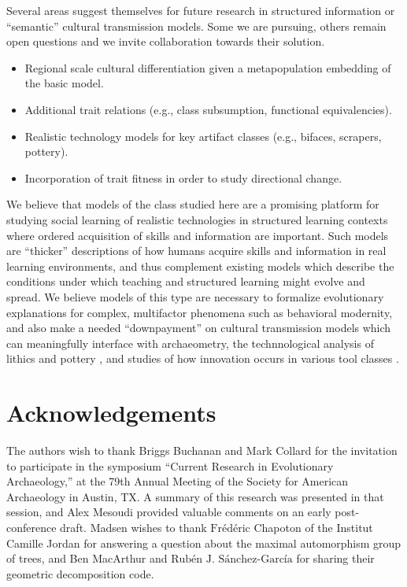 \documentclass[graybox,natbib]{svmult}
\begin{document}
Several areas suggest themselves for future research in structured
information or ``semantic'' cultural transmission models. Some we are
pursuing, others remain open questions and we invite collaboration
towards their solution.

\begin{itemize}
\itemsep1pt\parskip0pt
\item
  Regional scale cultural differentiation given a metapopulation
  embedding of the basic model.
\item
  Additional trait relations (e.g., class subsumption, functional
  equivalencies).
\item
  Realistic technology models for key artifact classes (e.g., bifaces,
  scrapers, pottery).
\item
  Incorporation of trait fitness in order to study directional change.
\end{itemize}

We believe that models of the class studied here are a promising
platform for studying social learning of realistic technologies in
structured learning contexts where ordered acquisition of skills and
information are important. Such models are ``thicker'' descriptions of
how humans acquire skills and information in real learning environments,
and thus complement existing models which describe the conditions under
which teaching and structured learning might evolve and spread. We
believe models of this type are necessary to formalize evolutionary
explanations for complex, multifactor phenomena such as behavioral
modernity, and also make a needed ``downpayment'' on cultural
transmission models which can meaningfully interface with archaeometry,
the technnological analysis of lithics and pottery
\citep{tostevin2012seeing}, and studies of how innovation occurs in
various tool classes \citep[e.g.,][]{o2010innovation}.

\section{Acknowledgements}\label{acknowledgements}

The authors wish to thank Briggs Buchanan and Mark Collard for the
invitation to participate in the symposium ``Current Research in
Evolutionary Archaeology,'' at the 79th Annual Meeting of the Society
for American Archaeology in Austin, TX. A summary of this research was
presented in that session, and Alex Mesoudi provided valuable comments
on an early post-conference draft. Madsen wishes to thank
$\textrm{Fr\'ed\'eric}$ Chapoton of the Institut Camille Jordan for
answering a question about the maximal automorphism group of trees, and
Ben MacArthur and $\textrm{Rub\'en J. S\'anchez-Garc\'ia}$ for sharing
their geometric decomposition code.
\end{document}
